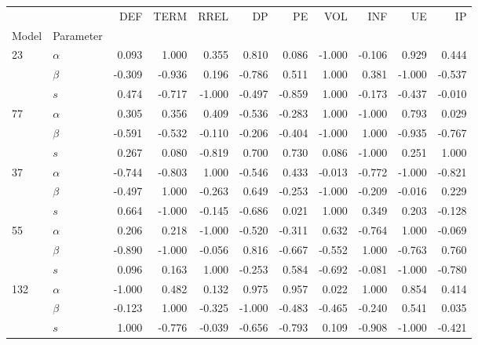 \begin{table}
\centering
\label{tab:SSD_ABS_standardised_10}
\begin{tabular}{llrrrrrrrrr}
\toprule
       &     &    DEF &   TERM &   RREL &     DP &     PE &    VOL &    INF &     UE &     IP \\
Model & Parameter &        &        &        &        &        &        &        &        &        \\
\midrule
\multirow{3}{*}{23} & $\alpha$ &  0.093 &  1.000 &  0.355 &  0.810 &  0.086 & -1.000 & -0.106 &  0.929 &  0.444 \\
       & $\beta$ & -0.309 & -0.936 &  0.196 & -0.786 &  0.511 &  1.000 &  0.381 & -1.000 & -0.537 \\
       & $s$ &  0.474 & -0.717 & -1.000 & -0.497 & -0.859 &  1.000 & -0.173 & -0.437 & -0.010 \\
\cline{1-11}
\multirow{3}{*}{77} & $\alpha$ &  0.305 &  0.356 &  0.409 & -0.536 & -0.283 &  1.000 & -1.000 &  0.793 &  0.029 \\
       & $\beta$ & -0.591 & -0.532 & -0.110 & -0.206 & -0.404 & -1.000 &  1.000 & -0.935 & -0.767 \\
       & $s$ &  0.267 &  0.080 & -0.819 &  0.700 &  0.730 &  0.086 & -1.000 &  0.251 &  1.000 \\
\cline{1-11}
\multirow{3}{*}{37} & $\alpha$ & -0.744 & -0.803 &  1.000 & -0.546 &  0.433 & -0.013 & -0.772 & -1.000 & -0.821 \\
       & $\beta$ & -0.497 &  1.000 & -0.263 &  0.649 & -0.253 & -1.000 & -0.209 & -0.016 &  0.229 \\
       & $s$ &  0.664 & -1.000 & -0.145 & -0.686 &  0.021 &  1.000 &  0.349 &  0.203 & -0.128 \\
\cline{1-11}
\multirow{3}{*}{55} & $\alpha$ &  0.206 &  0.218 & -1.000 & -0.520 & -0.311 &  0.632 & -0.764 &  1.000 & -0.069 \\
       & $\beta$ & -0.890 & -1.000 & -0.056 &  0.816 & -0.667 & -0.552 &  1.000 & -0.763 &  0.760 \\
       & $s$ &  0.096 &  0.163 &  1.000 & -0.253 &  0.584 & -0.692 & -0.081 & -1.000 & -0.780 \\
\cline{1-11}
\multirow{3}{*}{132} & $\alpha$ & -1.000 &  0.482 &  0.132 &  0.975 &  0.957 &  0.022 &  1.000 &  0.854 &  0.414 \\
       & $\beta$ & -0.123 &  1.000 & -0.325 & -1.000 & -0.483 & -0.465 & -0.240 &  0.541 &  0.035 \\
       & $s$ &  1.000 & -0.776 & -0.039 & -0.656 & -0.793 &  0.109 & -0.908 & -1.000 & -0.421 \\

\end{tabular}
\end{table}
